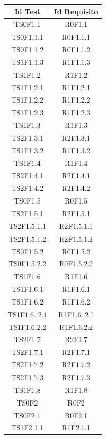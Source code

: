     \begin{longtable}{|c|c|}
    	\hline
    	\textbf{Id Test} & \textbf{Id Requisito}\\
    	\hline
    	\endhead
    	TS0F1.1&R0F1.1\\ \hline
    	TS0F1.1.1&R0F1.1.1 \\ \hline
    	TS0F1.1.2&R0F1.1.2 \\ \hline
    	TS1F1.1.3&R1F1.1.3 \\ \hline
    	TS1F1.2&R1F1.2 \\ \hline
    	TS1F1.2.1&R1F1.2.1 \\ \hline
    	TS1F1.2.2&R1F1.2.2 \\ \hline
    	TS1F1.2.3&R1F1.2.3 \\ \hline
    	TS1F1.3&R1F1.3 \\ \hline
    	TS2F1.3.1&R2F1.3.1 \\ \hline
    	TS1F1.3.2&R1F1.3.2 \\ \hline
    	TS1F1.4&R1F1.4 \\ \hline
    	TS2F1.4.1&R2F1.4.1 \\ \hline
    	TS2F1.4.2&R2F1.4.2 \\ \hline
    	TS0F1.5&R0F1.5 \\ \hline
    	TS2F1.5.1&R2F1.5.1 \\ \hline
    	TS2F1.5.1.1&R2F1.5.1.1 \\ \hline
    	TS2F1.5.1.2&R2F1.5.1.2 \\ \hline
    	TS0F1.5.2&R0F1.5.2 \\ \hline
    	TS0F1.5.2.2&R0F1.5.2.2 \\ \hline
    	TS1F1.6&R1F1.6 \\ \hline
    	TS1F1.6.1&R1F1.6.1 \\ \hline
    	TS1F1.6.2&R1F1.6.2 \\ \hline
    	TS1F1.6..2.1&R1F1.6..2.1 \\ \hline
    	TS1F1.6.2.2&R1F1.6.2.2 \\ \hline
    	TS2F1.7&R2F1.7 \\ \hline
    	TS2F1.7.1&R2F1.7.1 \\ \hline
    	TS2F1.7.2&R2F1.7.2 \\ \hline
    	TS2F1.7.3&R2F1.7.3 \\ \hline
    	TS1F1.8&R1F1.8 \\ \hline
    	TS0F2&R0F2 \\ \hline
    	TS0F2.1&R0F2.1 \\ \hline
    	TS1F2.1.1&R1F2.1.1 \\ \hline

\end{longtable}
